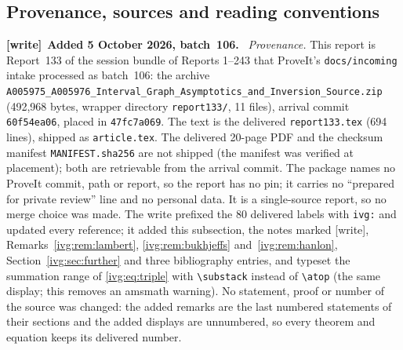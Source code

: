 \documentclass[11pt,letterpaper]{article}
\theoremstyle{definition}\newtheorem{definition}[theorem]{Definition}
\theoremstyle{remark}\newtheorem{remark}[theorem]{Remark}
\newcommand{\file}[1]{\nolinkurl{#1}}
\newenvironment{writenote}[1][]{\par\smallskip\begingroup\small
 \noindent\textbf{[write]}\if\relax\detokenize{#1}\relax\else~\textbf{#1.}\fi\ }%
 {\par\endgroup\smallskip}
\begin{document}
\subsection{Provenance, sources and reading conventions}\label{ivg:sec:provenance}
\begin{writenote}[Added 5 October 2026, batch~106]
\emph{Provenance.} This report is Report~133 of the session bundle of
Reports 1--243 that ProveIt's \file{docs/incoming} intake processed as
batch~106: the archive
\file{A005975_A005976_Interval_Graph_Asymptotics_and_Inversion_Source.zip}
(492{,}968 bytes, wrapper directory \file{report133/}, 11 files), arrival
commit \file{60f54ea06}, placed in \file{47fc7a069}. The text is the
delivered \file{report133.tex} (694 lines), shipped as \file{article.tex}.
The delivered 20-page PDF and the checksum manifest \file{MANIFEST.sha256}
are not shipped (the manifest was verified at placement); both are
retrievable from the arrival commit. The package names no ProveIt commit,
path or report, so the report has no pin; it carries no ``prepared for
private review'' line and no personal data. It is a single-source report,
so no merge choice was made. The write prefixed the 80 delivered labels
with \file{ivg:} and updated every reference; it added this subsection, the
notes marked [write], Remarks~\ref{ivg:rem:lambert},
\ref{ivg:rem:bukhjeffs} and~\ref{ivg:rem:hanlon},
Section~\ref{ivg:sec:further} and three bibliography entries, and typeset
the summation range of \eqref{ivg:eq:triple} with \verb|\substack| instead
of \verb|\atop| (the same display; this removes an \textsf{amsmath}
warning). No statement, proof or number of the source was changed: the
added remarks are the last numbered statements of their sections and the
added displays are unnumbered, so every theorem and equation keeps its
delivered number.


\end{writenote}
\end{document}
